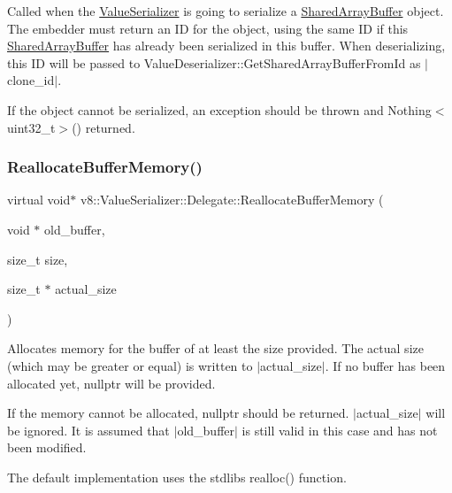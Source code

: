 Called when the \mbox{\hyperlink{classv8_1_1ValueSerializer}{Value\+Serializer}} is going to serialize a \mbox{\hyperlink{classv8_1_1SharedArrayBuffer}{Shared\+Array\+Buffer}} object. The embedder must return an ID for the object, using the same ID if this \mbox{\hyperlink{classv8_1_1SharedArrayBuffer}{Shared\+Array\+Buffer}} has already been serialized in this buffer. When deserializing, this ID will be passed to Value\+Deserializer\+::\+Get\+Shared\+Array\+Buffer\+From\+Id as $\vert$clone\+\_\+id$\vert$.

If the object cannot be serialized, an exception should be thrown and Nothing$<$uint32\+\_\+t$>$() returned. \mbox{\label{classv8_1_1ValueSerializer_1_1Delegate_a28e0ab8d14f5c9391df47cf75b4594fc}} 
\subsubsection{\texorpdfstring{Reallocate\+Buffer\+Memory()}{ReallocateBufferMemory()}}
{\footnotesize\ttfamily virtual void$\ast$ v8\+::\+Value\+Serializer\+::\+Delegate\+::\+Reallocate\+Buffer\+Memory (\begin{DoxyParamCaption}\item[{void $\ast$}]{old\+\_\+buffer,  }\item[{size\+\_\+t}]{size,  }\item[{size\+\_\+t $\ast$}]{actual\+\_\+size }\end{DoxyParamCaption})\hspace{0.3cm}{\ttfamily [virtual]}}

Allocates memory for the buffer of at least the size provided. The actual size (which may be greater or equal) is written to $\vert$actual\+\_\+size$\vert$. If no buffer has been allocated yet, nullptr will be provided.

If the memory cannot be allocated, nullptr should be returned. $\vert$actual\+\_\+size$\vert$ will be ignored. It is assumed that $\vert$old\+\_\+buffer$\vert$ is still valid in this case and has not been modified.

The default implementation uses the stdlib\textquotesingle{}s {\ttfamily realloc()} function. \mbox{\label{classv8_1_1ValueSerializer_1_1Delegate_a3681bfcd9a6c45f0b12bd7a8bdf34d85}} 
